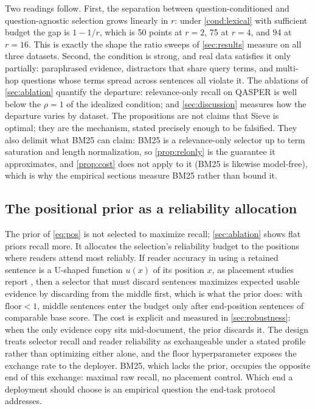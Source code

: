 \documentclass[review,12pt]{elsarticle}
\theoremstyle{remark}
\newcommand{\method}{Sieve}
\begin{document}
Two readings follow. First, the separation between question-conditioned
and question-agnostic selection grows linearly in $r$: under
\autoref{cond:lexical} with sufficient budget the gap is $1 - 1/r$,
which is 50 points at $r=2$, 75 at $r=4$, and 94 at $r=16$. This is
exactly the shape the ratio sweeps of \autoref{sec:results} measure on
all three datasets. Second, the condition is strong, and real data
satisfies it only partially: paraphrased evidence, distractors that
share query terms, and multi-hop questions whose terms spread across
sentences all violate it. The ablations of \autoref{sec:ablation}
quantify the departure: relevance-only recall on QASPER is well below
the $\rho = 1$ of the idealized condition; and \autoref{sec:discussion}
measures how the departure varies by dataset. The propositions are
not claims that \method{} is optimal; they are the mechanism, stated
precisely enough to be falsified. They also delimit what BM25 can
claim: BM25 is a relevance-only selector up to term saturation and
length normalization, so \autoref{prop:relonly} is the guarantee it
approximates, and \autoref{prop:cost} does not apply to it (BM25 is
likewise model-free), which is why the empirical sections measure BM25
rather than bound it.

\subsection{The positional prior as a reliability allocation}
The prior of \eqref{eq:pos} is not selected to maximize recall;
\autoref{sec:ablation} shows flat priors recall more. It allocates the
selection's reliability budget to the positions where readers attend
most reliably. If reader accuracy in using a retained sentence is a
U-shaped function $u(x)$ of its position $x$, as placement studies
report \citep{liu2023lost}, then a selector that must discard
sentences maximizes expected usable evidence by discarding from the
middle first, which is what the prior does: with
$\mathrm{floor} < 1$, middle sentences enter the budget only after
end-position sentences of comparable base score. The cost is explicit
and measured in \autoref{sec:robustness}: when the only evidence copy
sits mid-document, the prior discards it. The design treats selector
recall and reader reliability as exchangeable under a stated profile
rather than optimizing either alone, and the $\mathrm{floor}$
hyperparameter exposes the exchange rate to the deployer. BM25, which
lacks the prior, occupies the opposite end of this exchange: maximal
raw recall, no placement control. Which end a deployment should choose
is an empirical question the end-task protocol addresses.
\end{document}
